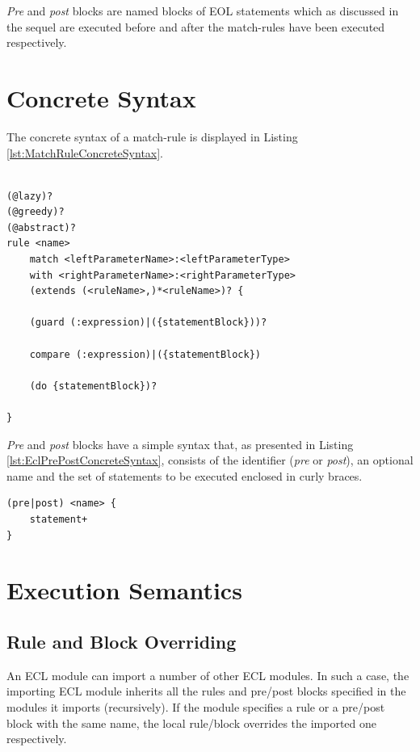 \emph{Pre} and \emph{post} blocks are named blocks of EOL statements which as discussed in the sequel are executed before and after the match-rules have been executed respectively.

\section{Concrete Syntax}

The concrete syntax of a match-rule is displayed in Listing \ref{lst:MatchRuleConcreteSyntax}.

\begin{lstlisting}[float=tbp, caption=Concrete Syntax of a MatchRule, label=lst:MatchRuleConcreteSyntax, language=ECL]

(@lazy)?
(@greedy)?
(@abstract)? 
rule <name> 
	match <leftParameterName>:<leftParameterType>
	with <rightParameterName>:<rightParameterType>
	(extends (<ruleName>,)*<ruleName>)? {
	
	(guard (:expression)|({statementBlock}))?
	
	compare (:expression)|({statementBlock})
	
	(do {statementBlock})?
	
}
\end{lstlisting}

\emph{Pre} and \emph{post} blocks have a simple syntax that, as presented in Listing \ref{lst:EclPrePostConcreteSyntax}, consists of the identifier (\emph{pre} or \emph{post}), an optional name and the set of statements to be executed enclosed in curly braces.

\begin{lstlisting}[float=tbp, caption=Concrete Syntax of Pre and Post blocks, label=lst:EclPrePostConcreteSyntax, language=ECL]
(pre|post) <name> {
	statement+
}
\end{lstlisting}

\section{Execution Semantics}

\subsection{Rule and Block Overriding}

An ECL module can import a number of other ECL modules. In such a case, the importing ECL module inherits all the rules and pre/post blocks specified in the modules it imports (recursively). If the module specifies a rule or a pre/post block with the same name, the local rule/block overrides the imported one respectively.

